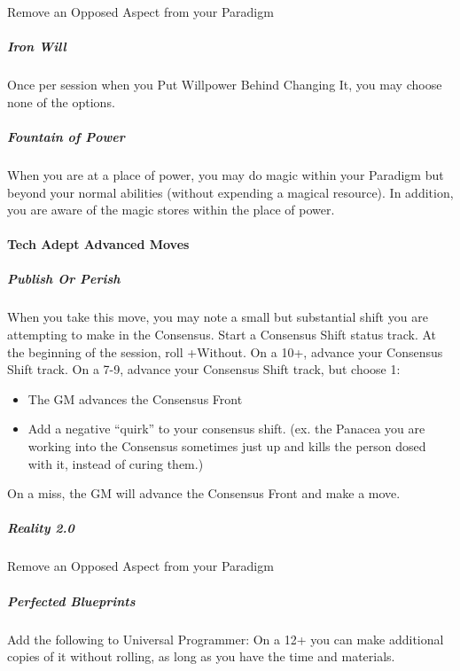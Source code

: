 \documentclass[
]{article}
\begin{document}
Remove an Opposed Aspect from your Paradigm

\hypertarget{iron-will}{%
\subparagraph{Iron Will}\label{iron-will}}

Once per session when you Put Willpower Behind Changing It, you may
choose none of the options.

\hypertarget{fountain-of-power}{%
\subparagraph{Fountain of Power}\label{fountain-of-power}}

When you are at a place of power, you may do magic within your Paradigm
but beyond your normal abilities (without expending a magical resource).
In addition, you are aware of the magic stores within the place of
power.

\hypertarget{tech-adept-advanced-moves}{%
\paragraph{Tech Adept Advanced Moves}\label{tech-adept-advanced-moves}}

\hypertarget{publish-or-perish}{%
\subparagraph{Publish Or Perish}\label{publish-or-perish}}

When you take this move, you may note a small but substantial shift you
are attempting to make in the Consensus. Start a Consensus Shift status
track. At the beginning of the session, roll +Without. On a 10+, advance
your Consensus Shift track. On a 7-9, advance your Consensus Shift
track, but choose 1:

\begin{itemize}
\item
  The GM advances the Consensus Front
\item
  Add a negative ``quirk'' to your consensus shift. (ex. the Panacea you
  are working into the Consensus sometimes just up and kills the person
  dosed with it, instead of curing them.)
\end{itemize}

On a miss, the GM will advance the Consensus Front and make a move.

\hypertarget{reality-2.0}{%
\subparagraph{Reality 2.0}\label{reality-2.0}}

Remove an Opposed Aspect from your Paradigm

\hypertarget{perfected-blueprints}{%
\subparagraph{Perfected Blueprints}\label{perfected-blueprints}}

Add the following to Universal Programmer: On a 12+ you can make
additional copies of it without rolling, as long as you have the time
and materials.
\end{document}
